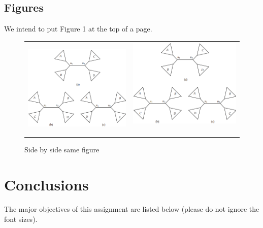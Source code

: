 \documentclass[18pt]{article}
\begin{document}
\subsection{Figures}
We intend to put Figure 1 at the top of a page.
\begin{figure}[t]
    \centering
    \begin{tabular}{cc}
        \includegraphics[angle=90]{Screenshot 2024-01-30 014001.png} & \includegraphics[angle=90]{Screenshot 2024-01-30 014001.png} \
    \end{tabular}
    \caption{Side by side same figure}
    \label{fig:enter-label}
\end{figure}

\section{Conclusions}
The major objectives of this assignment are listed below (please do not ignore the font sizes).
\end{document}
